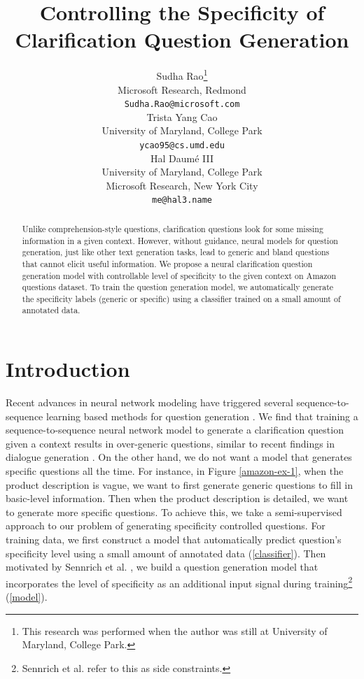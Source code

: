 \documentclass[11pt]{article}
\title{Controlling the Specificity of Clarification Question Generation}
\author{Sudha Rao\thanks{This research was performed when the author was still at University of Maryland, College Park.} \\
Microsoft Research, Redmond \\
{\tt Sudha.Rao@microsoft.com} \\ \And
Trista Yang Cao \\
University of Maryland, College Park \\
{\tt ycao95@cs.umd.edu} \\ \And
Hal Daum\'e III \\
University of Maryland, College Park \\
Microsoft Research, New York City\\
{\tt me@hal3.name} }
\date{}
\begin{document}
\maketitle
\begin{abstract}
Unlike comprehension-style questions, clarification questions look for some missing information in a given context. 
However, without guidance, neural models for question generation, just like other text generation tasks, lead to generic and bland questions that cannot elicit useful information. 
We propose a neural clarification question generation model with controllable level of specificity to the given context on Amazon questions dataset. 
To train the question generation model, we automatically generate the specificity labels (generic or specific) using a classifier trained on a small amount of annotated data. 

\end{abstract}


\section{Introduction}
\label{intro}
Recent advances in neural network modeling have triggered several sequence-to-sequence learning \cite{sutskever2014sequence} based methods for question generation \cite{serban2016generating,duan2017question,du2017learning}. 
We find that training a sequence-to-sequence neural network model to generate a clarification question given a context results in over-generic questions, similar to recent findings in dialogue generation \cite{li2016deep}. 
On the other hand, we do not want a model that generates specific questions all the time.
For instance, in Figure \ref{amazon-ex-1}, when the product description is vague, we want to first generate generic questions to fill in basic-level information.
Then when the product description is detailed, we want to generate more specific questions.
To achieve this, we take a semi-supervised approach to our problem of generating specificity controlled questions. For training data, we first construct a model that automatically predict question's specificity level using a small amount of annotated data (\cref{classifier}).  
Then motivated by Sennrich et al. \cite{sennrich2016controlling}, we build a question generation model that incorporates the level of specificity as an additional input signal during training\footnote{Sennrich et al. \cite{sennrich2016controlling} refer to this as side constraints.} (\cref{model}). 
\end{document}
